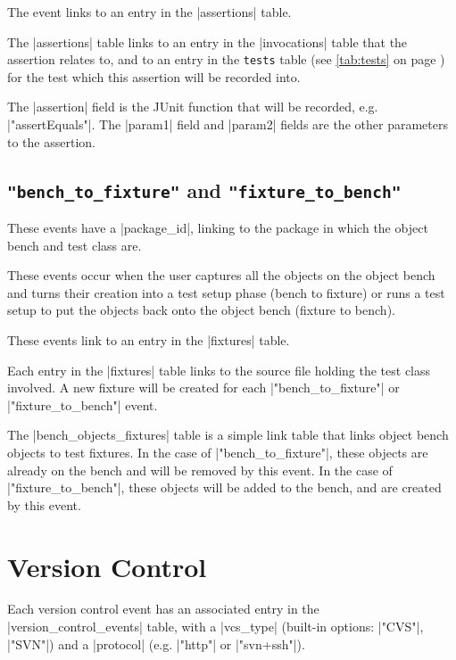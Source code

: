 \documentclass{report}
\newcommand{\myref}[1]{\autoref{#1} on page \pageref*{#1}}
\newcommand{\tabref}[1]{\lstinline|#1| table (see \myref{tab:#1})}
\begin{document}
The event links to an entry in the |assertions| table.


The |assertions| table links to an entry in the |invocations| table that the assertion
relates to, and to an entry in the \tabref{tests} for the test which
this assertion will be recorded into.

The |assertion| field is the JUnit function that will be recorded,
e.g. |"assertEquals"|.  The |param1| field and |param2| fields are
the other parameters to the assertion.

\subsection{\lstinline!"bench_to_fixture"! and \lstinline!"fixture_to_bench"!}

These events have a |package_id|, linking to the package in which the object bench
and test class are.

These events occur when the user captures all the objects on the object bench
and turns their creation into a test setup phase (bench to fixture) or runs a
test setup to put the objects back onto the object bench (fixture to bench).

These events link to an entry in the |fixtures| table.


Each entry in the |fixtures| table links to the source file holding the test
class involved.  A new fixture will be created for each |"bench_to_fixture"|
or |"fixture_to_bench"| event.


The |bench_objects_fixtures| table is a simple link table that links object
bench objects to test fixtures.  In the case of |"bench_to_fixture"|, these
objects are already on the bench and will be removed by this event.  In the
case of |"fixture_to_bench"|, these objects will be added to the bench, and
are created by this event.

\section{Version Control}



Each version control event has an associated entry in the
|version_control_events| table, with a |vcs_type| (built-in options:
|"CVS"|, |"SVN"|) and a |protocol| (e.g. |"http"| or |"svn+ssh"|).
\end{document}
